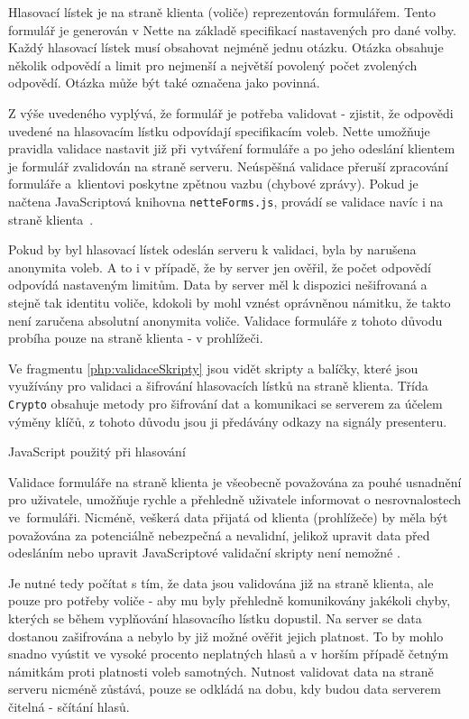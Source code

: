 Hlasovací lístek je na straně klienta (voliče) reprezentován formulářem. Tento formulář je generován v Nette na základě specifikací nastavených pro dané volby. Každý hlasovací lístek musí obsahovat nejméně jednu otázku. Otázka obsahuje několik odpovědí a limit pro nejmenší a největší povolený počet zvolených odpovědí. Otázka může být také označena jako povinná.

Z výše uvedeného vyplývá, že formulář je potřeba validovat - zjistit, že odpovědi uvedené na hlasovacím lístku odpovídají specifikacím voleb. Nette umožňuje pravidla validace nastavit již při vytváření formuláře a po jeho odeslání klientem je formulář zvalidován na straně serveru. Neúspěšná validace přeruší zpracování formuláře a~klientovi poskytne zpětnou vazbu (chybové zprávy). Pokud je načtena JavaScriptová knihovna \texttt{netteForms.js}, provádí se validace navíc i na straně klienta~\cite{NetteForms}.

Pokud by byl hlasovací lístek odeslán serveru k validaci, byla by narušena anonymita voleb. A to i v případě, že by server jen ověřil, že počet odpovědí odpovídá nastaveným limitům. Data by server měl k dispozici nešifrovaná a stejně tak identitu voliče, kdokoli by mohl vznést oprávněnou námitku, že takto není zaručena absolutní anonymita voliče. Validace formuláře z tohoto důvodu probíha pouze na straně klienta - v prohlížeči.

Ve fragmentu \ref{php:validaceSkripty} jsou vidět skripty a balíčky, které jsou využívány pro validaci a šifrování hlasovacích lístků na straně klienta. Třída \texttt{Crypto} obsahuje metody pro šifrování dat a komunikaci se serverem za účelem výměny klíčů, z tohoto důvodu jsou ji předávány odkazy na signály presenteru.

\begin{listing}[ht]
\caption{JavaScript použitý při hlasování}
\label{php:validaceSkripty}
\end{listing}

\clearpage
{}\label{section:hlasovaniValidace}
Validace formuláře na straně klienta je všeobecně považována za pouhé usnadnění pro uživatele, umožňuje rychle a přehledně uživatele informovat o nesrovnalostech ve~formuláři. Nicméně, veškerá data přijatá od klienta (prohlížeče) by měla být považována za potenciálně nebezpečná a nevalidní, jelikož upravit data před odesláním nebo upravit JavaScriptové validační skripty není nemožné \cite{Validace1}\cite{Validace2}\cite{Validace3}.

Je nutné tedy počítat s tím, že data jsou validována již na straně klienta, ale pouze pro potřeby voliče - aby mu byly přehledně komunikovány jakékoli chyby, kterých se během vyplňování hlasovacího lístku dopustil. Na server se data dostanou zašifrována a nebylo by již možné ověřit jejich platnost. To by mohlo snadno vyústit ve vysoké procento neplatných hlasů a v horším případě četným námitkám proti platnosti voleb samotných. Nutnost validovat data na straně serveru nicméně zůstává, pouze se odkládá na dobu, kdy budou data serverem čitelná - sčítání hlasů.

